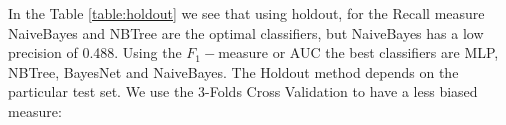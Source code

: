 \documentclass[fleqn,10pt]{SelfArx} %
\begin{document}
\begin{table}[h]
\caption{Evaluation measures using Holdout}
\label{table:holdout}
\end{table}

\noindent
In the Table \ref{table:holdout} we see that using holdout, for the Recall measure NaiveBayes and NBTree are the optimal classifiers, but NaiveBayes has a low precision of 0.488. Using the $F_1-$measure or AUC the best classifiers are MLP, NBTree, BayesNet and NaiveBayes.\newline
The Holdout method depends on the particular test set. We use the 3-Folds Cross Validation to have a less biased measure:
\end{document}
